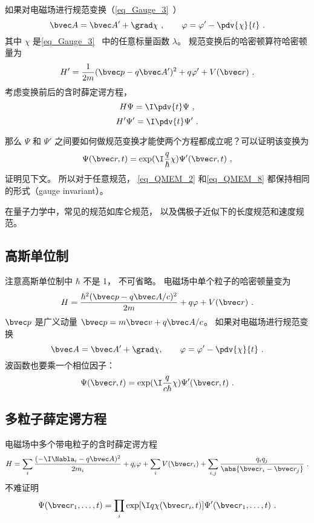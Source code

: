 如果对电磁场进行规范变换（\autoref{eq_Gauge_3}~）
\begin{equation}\label{eq_QMEM_5}
\bvec A = \bvec A' + \grad \chi~,
\qquad
\varphi = \varphi' - \pdv{\chi}{t}~.
\end{equation}
其中 $\chi$ 是\autoref{eq_Gauge_3}~ 中的任意标量函数 $\lambda$。 规范变换后的哈密顿算符哈密顿量为
\begin{equation}\label{eq_QMEM_8}
H' = \frac{1}{2m} (\bvec p - q\bvec A')^2 + q\varphi' + V(\bvec r)~.
\end{equation}
考虑变换前后的含时薛定谔方程，
\begin{equation}\label{eq_QMEM_9}
H\Psi = \I \pdv{t}\Psi~,
\end{equation}
\begin{equation}\label{eq_QMEM_10}
H'\Psi' = \I \pdv{t}\Psi'~.
\end{equation}

那么 $\Psi$ 和 $\Psi'$ 之间要如何做规范变换才能使两个方程都成立呢？可以证明该变换为 
\begin{equation}\label{eq_QMEM_3}
\Psi(\bvec r, t) = \exp(\I \frac{q}{\hbar}\chi) \Psi'(\bvec r, t)~,
\end{equation}
证明见下文。 所以对于任意规范， \autoref{eq_QMEM_2} 和\autoref{eq_QMEM_8} 都保持相同的形式（gauge invariant）。

在量子力学中，常见的规范如库仑规范， 以及偶极子近似下的长度规范和速度规范。

\subsection{高斯单位制}
注意高斯单位制中 $\hbar$ 不是 1， 不可省略。 电磁场中单个粒子的哈密顿量变为
\begin{equation}
H = \frac{\hbar^2(\bvec p - q\bvec A/c)^2}{2m} + q\varphi + V(\bvec r)~.
\end{equation}
$\bvec p$ 是广义动量 $\bvec p=m\bvec v+q\bvec A/c$。
如果对电磁场进行规范变换
\begin{equation}
\bvec A=\bvec A'+\grad \chi,\qquad \varphi =\varphi' - \pdv{\chi}{t}~.
\end{equation}
波函数也要乘一个相位因子：
\begin{equation}
\Psi(\bvec r,t)=\exp(\I\frac{q}{c\hbar} \chi)\Psi'(\bvec r,t)~.
\end{equation}

\subsection{多粒子薛定谔方程}
电磁场中多个带电粒子的含时薛定谔方程
\begin{equation}
H = \sum_i \frac{(-\I\Nabla_i - q\bvec A)^2}{2m_i} + q_i\varphi + \sum_i V(\bvec r_i) + \sum_{i,j}\frac{q_iq_j}{\abs{\bvec r_i-\bvec r_j}}~.
\end{equation}
不难证明
\begin{equation}
\Psi(\bvec r_1, \dots,t)= \prod_i \exp[\I q\chi(\bvec r_i, t)]\Psi'(\bvec r_1, \dots,t)~.
\end{equation}

